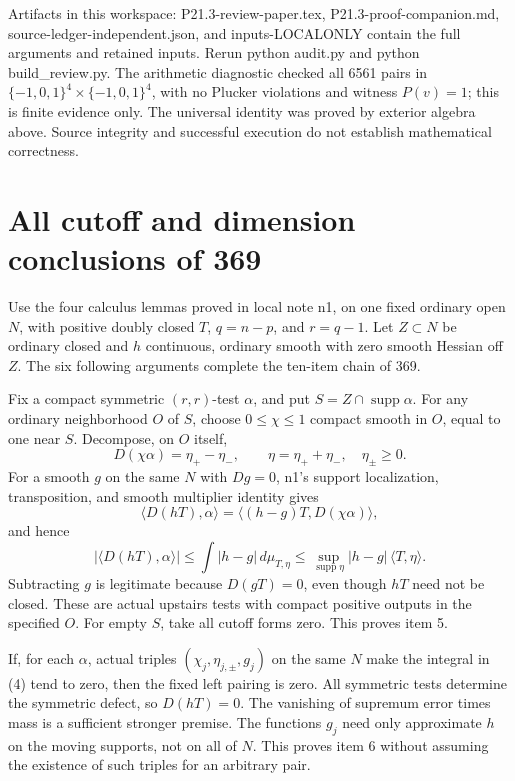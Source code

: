 \documentclass[11pt]{article}
\begin{document}
Artifacts in this workspace: P21.3-review-paper.tex, P21.3-proof-companion.md, source-ledger-independent.json, and inputs-LOCALONLY contain the full arguments and retained inputs. Rerun python audit.py and python build\_review.py. The arithmetic diagnostic checked all 6561 pairs in \(\{-1,0,1\}^4\times\{-1,0,1\}^4\), with no Plucker violations and witness \(P(v)=1\); this is finite evidence only. The universal identity was proved by exterior algebra above. Source integrity and successful execution do not establish mathematical correctness.

\section{All cutoff and dimension conclusions of 369}


Use the four calculus lemmas proved in local note n1, on one fixed ordinary open \(N\), with positive doubly closed \(T\), \(q=n-p\), and \(r=q-1\). Let \(Z\subset N\) be ordinary closed and \(h\) continuous, ordinary smooth with zero smooth Hessian off \(Z\). The six following arguments complete the ten-item chain of 369.

Fix a compact symmetric \((r,r)\)-test \(\alpha\), and put \(S=Z\cap\operatorname{supp}\alpha\). For any ordinary neighborhood \(O\) of \(S\), choose \(0\leq\chi\leq1\) compact smooth in \(O\), equal to one near \(S\). Decompose, on \(O\) itself,
\[
 D(\chi\alpha)=\eta_+-\eta_-,\qquad\eta=\eta_++\eta_-,\quad\eta_\pm\geq0.
\]
For a smooth \(g\) on the same \(N\) with \(Dg=0\), n1's support localization, transposition, and smooth multiplier identity gives
\[
 \langle D(hT),\alpha\rangle
 =\langle (h-g)T,D(\chi\alpha)\rangle,
\]
and hence
\[
 |\langle D(hT),\alpha\rangle|
 \leq\int|h-g|\,d\mu_{T,\eta}
 \leq\sup_{\operatorname{supp}\eta}|h-g|\,\langle T,\eta\rangle.              \tag{4}
\]
Subtracting \(g\) is legitimate because \(D(gT)=0\), even though \(hT\) need not be closed. These are actual upstairs tests with compact positive outputs in the specified \(O\). For empty \(S\), take all cutoff forms zero. This proves item 5.

If, for each \(\alpha\), actual triples \((\chi_j,\eta_{j,\pm},g_j)\) on the same \(N\) make the integral in (4) tend to zero, then the fixed left pairing is zero. All symmetric tests determine the symmetric defect, so \(D(hT)=0\). The vanishing of supremum error times mass is a sufficient stronger premise. The functions \(g_j\) need only approximate \(h\) on the moving supports, not on all of \(N\). This proves item 6 without assuming the existence of such triples for an arbitrary pair.
\end{document}

